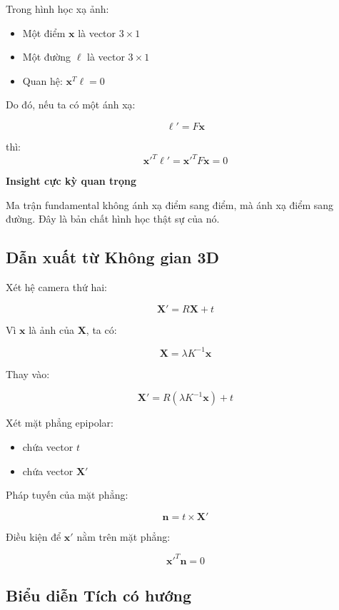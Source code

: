 Trong hình học xạ ảnh:

\begin{itemize}
	\item Một điểm $\mathbf{x}$ là vector $3 \times 1$
	\item Một đường $\ell$ là vector $3 \times 1$
	\item Quan hệ: $\mathbf{x}^T \ell = 0$
\end{itemize}

Do đó, nếu ta có một ánh xạ:

\[
\ell' = F \mathbf{x}
\]

thì:
\[
\mathbf{x}'^T \ell' = \mathbf{x}'^T F \mathbf{x} = 0
\]

\begin{mdframed}[style=infobox]
	\textbf{Insight cực kỳ quan trọng}
	
	Ma trận fundamental không ánh xạ điểm sang điểm, mà ánh xạ điểm sang đường. Đây là bản chất hình học thật sự của nó.
\end{mdframed}

\subsection{Dẫn xuất từ Không gian 3D}
\label{subsec:derivation_geometry}

Xét hệ camera thứ hai:

\[
\mathbf{X}' = R\mathbf{X} + t
\]

Vì $\mathbf{x}$ là ảnh của $\mathbf{X}$, ta có:

\[
\mathbf{X} = \lambda K^{-1} \mathbf{x}
\]

Thay vào:

\[
\mathbf{X}' = R(\lambda K^{-1}\mathbf{x}) + t
\]

Xét mặt phẳng epipolar:

\begin{itemize}
	\item chứa vector $t$
	\item chứa vector $\mathbf{X}'$
\end{itemize}

Pháp tuyến của mặt phẳng:

\[
\mathbf{n} = t \times \mathbf{X}'
\]

Điều kiện để $\mathbf{x}'$ nằm trên mặt phẳng:

\[
\mathbf{x}'^T \mathbf{n} = 0
\]

\subsection{Biểu diễn Tích có hướng}
\label{subsec:skew_matrix}

